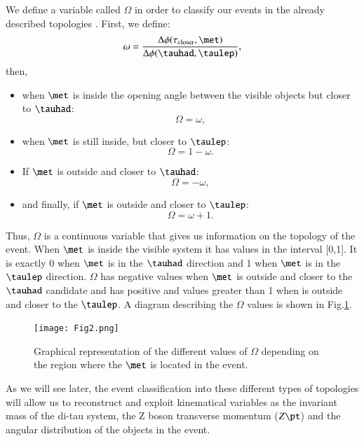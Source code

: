 We define a variable called $\Omega$ in order to classify our events in the already described topologies . First, we define:
\begin{equation}
\omega=\frac{\Delta\phi(\tau_{\text{closer}},\met)}{\Delta\phi(\tauhad,\taulep)},
\end{equation}
then,
\begin{itemize}
	\item when $\met$ is inside the opening angle between the visible objects but closer to $\tauhad$:
	\begin{equation}
	\Omega=\omega,
	\end{equation}
	\item when $\met$ is still inside, but closer to $\taulep$:
	\begin{equation}
	\Omega=1-\omega.
	\end{equation}
	\item If $\met$ is outside and closer to $\tauhad$:
	\begin{equation}
	\Omega=-\omega,
	\end{equation}
	\item and finally, if $\met$ is outside and closer to $\taulep$:
	\begin{equation}
	\Omega=\omega+1.
	\end{equation}
\end{itemize}
Thus, $\Omega$ is a continuous variable that gives us information on the topology of the event. When $\met$ is inside the visible system it has values in the interval [0,1]. It is exactly 0 when $\met$ is in the $\tauhad$ direction and 1 when $\met$ is in the $\taulep$ direction. $\Omega$ has negative values when $\met$ is outside and closer to the $\tauhad$ candidate and has positive and values greater than 1 when is outside and closer to the $\taulep$. A diagram describing the $\Omega$ values is shown in Fig.\ref{Fig2}.
\begin{figure}[htbp]
	\centering
	\texttt{[image: Fig2.png]}
	\caption{Graphical representation of the different values of $\Omega$ depending on the region where the $\met$ is located in the event.}
	\label{Fig2}
\end{figure}
As we will see later, the event classification into these different types of topologies will allow us to reconstruct and exploit kinematical variables as the invariant mass of the di-tau system, the Z boson transverse momentum ($Z\pt$) and the angular distribution of the objects in the event.

